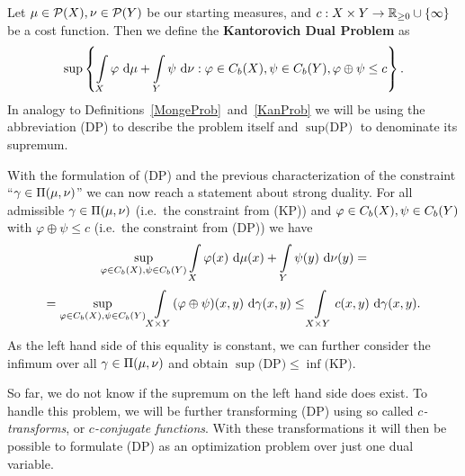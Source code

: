 \begin{definition}\label{DualProb}
	Let $\mu \in \PM{X}, \nu \in \PM{Y}$ be our starting measures, and $\map[c]{X \times Y}{\RZero{} \cup{} \{ \infty \}}$ be a cost function. Then we define the \textbf{Kantorovich Dual Problem} as
	\begin{equation}\label{DPEq}
		\sup \left\{ \int\limits_{X} \varphi~\D + \int\limits_{Y} \psi~\D[\nu] : \varphi \in \CF[b]{X}, \psi \in \CF[b]{Y}, \varphi \oplus \psi \le c \right\}.
	\end{equation}
	In analogy to Definitions~\ref{MongeProb}~and~\ref{KanProb} we will be using the abbreviation (DP) to describe the problem itself and $\sup \text{(DP)}$ to denominate its supremum.
\end{definition}

With the formulation of (DP) and the previous characterization of the constraint ``$\gamma \in \TP{\mu}{\nu}$'' we can now reach a statement about strong duality. For all admissible $\gamma \in \TP{\mu}{\nu}$ (i.e.~the constraint from (KP)) and $\varphi \in \CF[b]{X}, \psi \in \CF[b]{Y}$ with $\varphi \oplus \psi \le c$ (i.e.~the constraint from (DP)) we have
\[ \sup\limits_{\varphi \in \CF[b]{X}, \psi \in \CF[b]{Y}} \int\limits_{X} \varphi(x)~\Dx{\mu} + \int\limits_{Y} \psi(y)~\Dx[y]{\nu} = \]
\[ = \sup\limits_{\varphi \in \CF[b]{X}, \psi \in \CF[b]{Y}} \int\limits_{X \times Y} (\varphi \oplus \psi)(x, y)~\Dx[x, y]{\gamma} \le \int\limits_{X \times Y} c(x, y)~\Dx[x, y]{\gamma}. \]
As the left hand side of this equality is constant, we can further consider the infimum over all $\gamma \in \TP{\mu}{\nu}$ and obtain $\sup \text{(DP)} \le \inf \text{(KP)}$.

So far, we do not know if the supremum on the left hand side does exist. To handle this problem, we will be further transforming (DP) using so called \textit{$c$-transforms}, or \textit{$c$-conjugate functions}. With these transformations it will then be possible to formulate (DP) as an optimization problem over just one dual variable.

